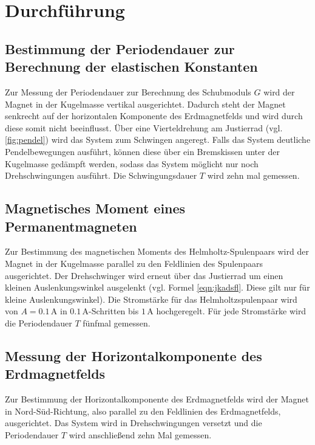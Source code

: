 
\section{Durchführung}
\label{sec:Durchführung}
\subsection{Bestimmung der Periodendauer zur Berechnung der elastischen Konstanten}
Zur Messung der Periodendauer zur Berechnung des Schubmoduls $G$ wird der Magnet in der Kugelmasse vertikal ausgerichtet. Dadurch steht der Magnet senkrecht auf der horizontalen Komponente des Erdmagnetfelds und wird durch diese somit nicht beeinflusst.
Über eine Vierteldrehung am Justierrad (vgl. \ref{fig:pendel}) wird das System zum Schwingen angeregt.
Falls das System deutliche Pendelbewegungen ausführt, können diese über ein Bremskissen unter der Kugelmasse gedämpft werden, sodass das System möglicht nur noch Drehschwingungen ausführt.
Die Schwingungsdauer $T$ wird zehn mal gemessen.
\subsection{Magnetisches Moment eines Permanentmagneten}
Zur Bestimmung des magnetischen Moments des Helmholtz-Spulenpaars wird der Magnet in der Kugelmasse parallel zu den Feldlinien des Spulenpaars ausgerichtet.
Der Drehschwinger wird erneut über das Justierrad um einen kleinen Auslenkungswinkel ausgelenkt (vgl. Formel \eqref{eqn:jkadsfl}. Diese gilt nur für kleine Auslenkungswinkel).
Die Stromstärke für das Helmholtzspulenpaar wird von $A=0.1\,\si{\ampere}$ in $0.1\,\si{\ampere}$-Schritten bis $1\,\si{\ampere}$ hochgeregelt.
Für jede Stromstärke wird die Periodendauer $T$ fünfmal gemessen.
\subsection{Messung der Horizontalkomponente des Erdmagnetfelds}
Zur Bestimmung der Horizontalkomponente des Erdmagnetfelds wird der Magnet in Nord-Süd-Richtung, also parallel zu den Feldlinien des Erdmagnetfelds, ausgerichtet.
Das System wird in Drehschwingungen versetzt und die Periodendauer $T$ wird anschließend zehn Mal gemessen.
